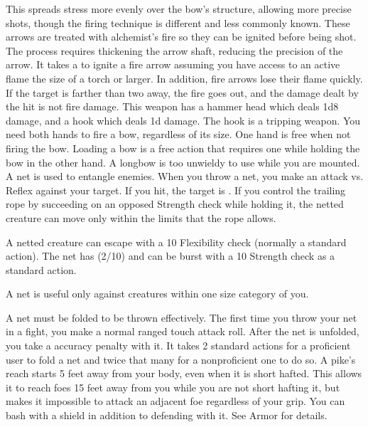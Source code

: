         This spreads stress more evenly over the bow's structure, allowing more precise shots, though the firing technique is different and less commonly known.
         These arrows are treated with alchemist's fire so they can be ignited before being shot.
        The process requires thickening the arrow shaft, reducing the precision of the arrow.
        It takes a  to ignite a fire arrow assuming you have access to an active flame the size of a torch or larger.
        In addition, fire arrows lose their flame quickly.
        If the target is farther than two  away, the fire goes out, and the damage dealt by the hit is not fire damage.
         This weapon has a hammer head which deals 1d8 damage, and a hook which deals \minus1d damage. The hook is a tripping weapon.
         You need both hands to fire a bow, regardless of its size. One hand is free when not firing the bow. Loading a bow is a free action that requires one  while holding the bow in the other hand. A longbow is too unwieldy to use while you are mounted.
         A net is used to entangle enemies. When you throw a net, you make an attack vs. Reflex against your target. If you hit, the target is \slowed. If you control the trailing rope by succeeding on an opposed Strength check while holding it, the netted creature can move only within the limits that the rope allows.
        \par A netted creature can escape with a  10 Flexibility check (normally a standard action). The net has (2/10) and can be burst with a  10 Strength check as a standard action.
        \par A net is useful only against creatures within one size category of you.
        \par A net must be folded to be thrown effectively. The first time you throw your net in a fight, you make a normal ranged touch attack roll. After the net is unfolded, you take a  accuracy penalty with it. It takes 2 standard actions for a proficient user to fold a net and twice that many for a nonproficient one to do so.
         A pike's reach starts 5 feet away from your body, even when it is short hafted.
        This allows it to reach foes 15 feet away from you while you are not short hafting it, but makes it impossible to attack an adjacent foe regardless of your grip.
         You can bash with a shield in addition to defending with it. See Armor for details.

